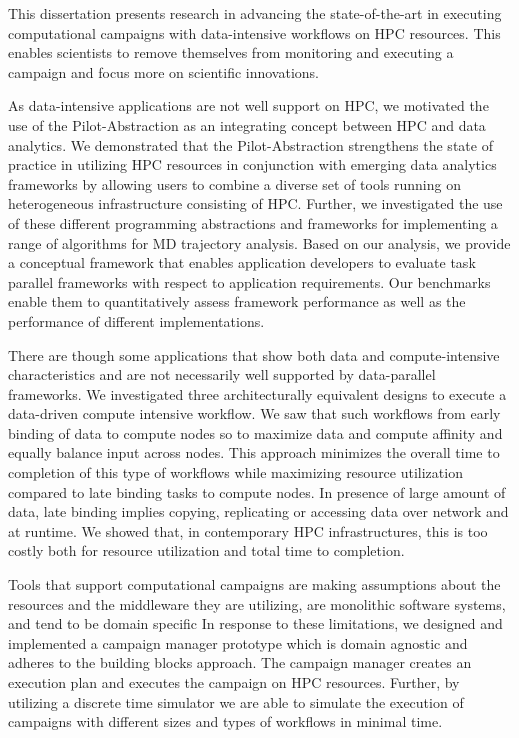 \label{ch:conclusions}

This dissertation presents research in advancing the state-of-the-art in executing computational campaigns with data-intensive workflows on HPC resources.
This enables scientists to remove themselves from monitoring and executing a campaign and focus more on scientific innovations.

As data-intensive applications are not well support on HPC, we motivated the use of the Pilot-Abstraction as an integrating concept between HPC and data analytics.
We demonstrated that the Pilot-Abstraction strengthens the state of practice in utilizing HPC resources in conjunction with emerging data analytics frameworks by allowing users to combine a diverse set of tools running on heterogeneous infrastructure consisting of HPC.
Further, we investigated the use of these different programming abstractions and frameworks for implementing a range of algorithms for MD trajectory analysis. 
Based on our analysis, we provide a conceptual framework that enables application developers to evaluate task parallel frameworks with respect to application requirements. 
Our benchmarks enable them to quantitatively assess framework performance as well as the performance of different implementations. 

There are though some applications that show both data and compute-intensive characteristics and are not necessarily well supported by data-parallel frameworks.
We investigated three architecturally equivalent designs to execute a data-driven compute intensive workflow.
We saw that such workflows from early binding of data to compute nodes so to maximize data and compute affinity and equally balance input across nodes.
This approach minimizes the overall time to completion of this type of workflows while maximizing resource utilization compared to late binding tasks to compute nodes.
In presence of large amount of data, late binding implies copying, replicating or accessing data over network and at runtime.
We showed that, in contemporary HPC infrastructures, this is too costly both for resource utilization and total time to completion.

Tools that support computational campaigns are making assumptions about the resources and the middleware they are utilizing, are monolithic software systems, and tend to be domain specific
In response to these limitations, we designed and implemented a campaign manager prototype which is domain agnostic and adheres to the building blocks approach.
The campaign manager creates an execution plan and executes the campaign on HPC resources.
Further, by utilizing a discrete time simulator we are able to simulate the execution of campaigns with different sizes and types of workflows in minimal time.

